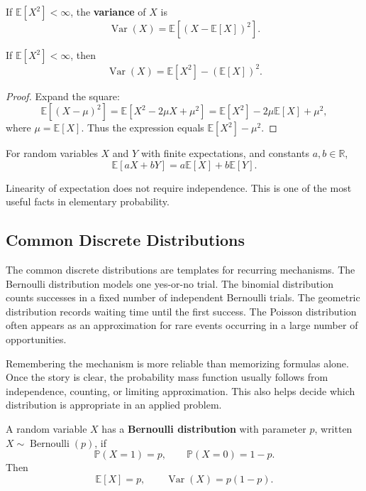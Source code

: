 \begin{definition}[Variance]
If $\mathbb{E}[X^2]<\infty$, the \textbf{variance} of $X$ is
\[
    \operatorname{Var}(X)=\mathbb{E}[(X-\mathbb{E}[X])^2].
\]
\end{definition}

\begin{proposition}
If $\mathbb{E}[X^2]<\infty$, then
\[
    \operatorname{Var}(X)=\mathbb{E}[X^2]-(\mathbb{E}[X])^2.
\]
\end{proposition}

\begin{proof}
Expand the square:
\[
    \mathbb{E}[(X-\mu)^2]=\mathbb{E}[X^2-2\mu X+\mu^2]
    =\mathbb{E}[X^2]-2\mu\mathbb{E}[X]+\mu^2,
\]
where $\mu=\mathbb{E}[X]$. Thus the expression equals $\mathbb{E}[X^2]-\mu^2$.
\end{proof}

\begin{proposition}
For random variables $X$ and $Y$ with finite expectations, and constants $a,b\in\mathbb{R}$,
\[
    \mathbb{E}[aX+bY]=a\mathbb{E}[X]+b\mathbb{E}[Y].
\]
\end{proposition}

\begin{remark}
Linearity of expectation does not require independence. This is one of the most useful facts in elementary probability.
\end{remark}

\subsection{Common Discrete Distributions}


The common discrete distributions are templates for recurring mechanisms. The Bernoulli distribution models one yes-or-no trial. The binomial distribution counts successes in a fixed number of independent Bernoulli trials. The geometric distribution records waiting time until the first success. The Poisson distribution often appears as an approximation for rare events occurring in a large number of opportunities.

Remembering the mechanism is more reliable than memorizing formulas alone. Once the story is clear, the probability mass function usually follows from independence, counting, or limiting approximation. This also helps decide which distribution is appropriate in an applied problem.

\begin{definition}
A random variable $X$ has a \textbf{Bernoulli distribution} with parameter $p$, written $X\sim\operatorname{Bernoulli}(p)$, if
\[
    \mathbb{P}(X=1)=p,
    \qquad
    \mathbb{P}(X=0)=1-p.
\]
Then
\[
    \mathbb{E}[X]=p,
    \qquad
    \operatorname{Var}(X)=p(1-p).
\]
\end{definition}

